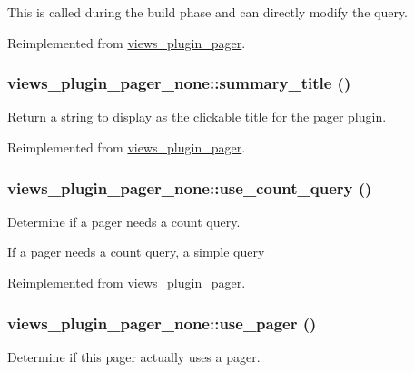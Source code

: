 This is called during the build phase and can directly modify the query. 

Reimplemented from \hyperlink{classviews__plugin__pager_a6b9aad7e28125013cbf7a15c19e78d47}{views\_\-plugin\_\-pager}.\hypertarget{classviews__plugin__pager__none_abf1170948c1653a9b6e8d4c92273060b}{
\subsubsection[{summary\_\-title}]{\setlength{\rightskip}{0pt plus 5cm}views\_\-plugin\_\-pager\_\-none::summary\_\-title ()}}
\label{classviews__plugin__pager__none_abf1170948c1653a9b6e8d4c92273060b}
Return a string to display as the clickable title for the pager plugin. 

Reimplemented from \hyperlink{classviews__plugin__pager_a12df2a012d53b9276a14fae94511f686}{views\_\-plugin\_\-pager}.\hypertarget{classviews__plugin__pager__none_a2a4be240474e0db5577ff4f8b7364b15}{
\subsubsection[{use\_\-count\_\-query}]{\setlength{\rightskip}{0pt plus 5cm}views\_\-plugin\_\-pager\_\-none::use\_\-count\_\-query ()}}
\label{classviews__plugin__pager__none_a2a4be240474e0db5577ff4f8b7364b15}
Determine if a pager needs a count query.

If a pager needs a count query, a simple query 

Reimplemented from \hyperlink{classviews__plugin__pager_a693a102e85a9b63bc59057a4efca0d12}{views\_\-plugin\_\-pager}.\hypertarget{classviews__plugin__pager__none_a60e31c5b5a026cf9ce14d6d8664c4407}{
\subsubsection[{use\_\-pager}]{\setlength{\rightskip}{0pt plus 5cm}views\_\-plugin\_\-pager\_\-none::use\_\-pager ()}}
\label{classviews__plugin__pager__none_a60e31c5b5a026cf9ce14d6d8664c4407}
Determine if this pager actually uses a pager.

